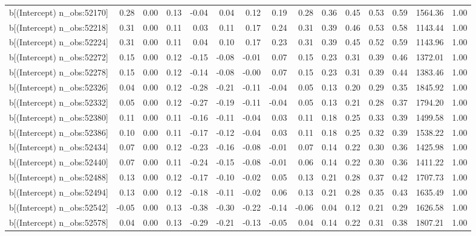 \begin{table}[ht]
\begin{tabular}{rrrrrrrrrrrrrrr}
  b[(Intercept) n\_obs:52170] & 0.28 & 0.00 & 0.13 & -0.04 & 0.04 & 0.12 & 0.19 & 0.28 & 0.36 & 0.45 & 0.53 & 0.59 & 1564.36 & 1.00 \\ 
  b[(Intercept) n\_obs:52218] & 0.31 & 0.00 & 0.11 & 0.03 & 0.11 & 0.17 & 0.24 & 0.31 & 0.39 & 0.46 & 0.53 & 0.58 & 1143.44 & 1.00 \\ 
  b[(Intercept) n\_obs:52224] & 0.31 & 0.00 & 0.11 & 0.04 & 0.10 & 0.17 & 0.23 & 0.31 & 0.39 & 0.45 & 0.52 & 0.59 & 1143.96 & 1.00 \\ 
  b[(Intercept) n\_obs:52272] & 0.15 & 0.00 & 0.12 & -0.15 & -0.08 & -0.01 & 0.07 & 0.15 & 0.23 & 0.31 & 0.39 & 0.46 & 1372.01 & 1.00 \\ 
  b[(Intercept) n\_obs:52278] & 0.15 & 0.00 & 0.12 & -0.14 & -0.08 & -0.00 & 0.07 & 0.15 & 0.23 & 0.31 & 0.39 & 0.44 & 1383.46 & 1.00 \\ 
  b[(Intercept) n\_obs:52326] & 0.04 & 0.00 & 0.12 & -0.28 & -0.21 & -0.11 & -0.04 & 0.05 & 0.13 & 0.20 & 0.29 & 0.35 & 1845.92 & 1.00 \\ 
  b[(Intercept) n\_obs:52332] & 0.05 & 0.00 & 0.12 & -0.27 & -0.19 & -0.11 & -0.04 & 0.05 & 0.13 & 0.21 & 0.28 & 0.37 & 1794.20 & 1.00 \\ 
  b[(Intercept) n\_obs:52380] & 0.11 & 0.00 & 0.11 & -0.16 & -0.11 & -0.04 & 0.03 & 0.11 & 0.18 & 0.25 & 0.33 & 0.39 & 1499.58 & 1.00 \\ 
  b[(Intercept) n\_obs:52386] & 0.10 & 0.00 & 0.11 & -0.17 & -0.12 & -0.04 & 0.03 & 0.11 & 0.18 & 0.25 & 0.32 & 0.39 & 1538.22 & 1.00 \\ 
  b[(Intercept) n\_obs:52434] & 0.07 & 0.00 & 0.12 & -0.23 & -0.16 & -0.08 & -0.01 & 0.07 & 0.14 & 0.22 & 0.30 & 0.36 & 1425.98 & 1.00 \\ 
  b[(Intercept) n\_obs:52440] & 0.07 & 0.00 & 0.11 & -0.24 & -0.15 & -0.08 & -0.01 & 0.06 & 0.14 & 0.22 & 0.30 & 0.36 & 1411.22 & 1.00 \\ 
  b[(Intercept) n\_obs:52488] & 0.13 & 0.00 & 0.12 & -0.17 & -0.10 & -0.02 & 0.05 & 0.13 & 0.21 & 0.28 & 0.37 & 0.42 & 1707.73 & 1.00 \\ 
  b[(Intercept) n\_obs:52494] & 0.13 & 0.00 & 0.12 & -0.18 & -0.11 & -0.02 & 0.06 & 0.13 & 0.21 & 0.28 & 0.35 & 0.43 & 1635.49 & 1.00 \\ 
  b[(Intercept) n\_obs:52542] & -0.05 & 0.00 & 0.13 & -0.38 & -0.30 & -0.22 & -0.14 & -0.06 & 0.04 & 0.12 & 0.21 & 0.29 & 1626.58 & 1.00 \\ 
  b[(Intercept) n\_obs:52578] & 0.04 & 0.00 & 0.13 & -0.29 & -0.21 & -0.13 & -0.05 & 0.04 & 0.14 & 0.22 & 0.31 & 0.38 & 1807.21 & 1.00 \\ 

\end{tabular}
\end{table}
